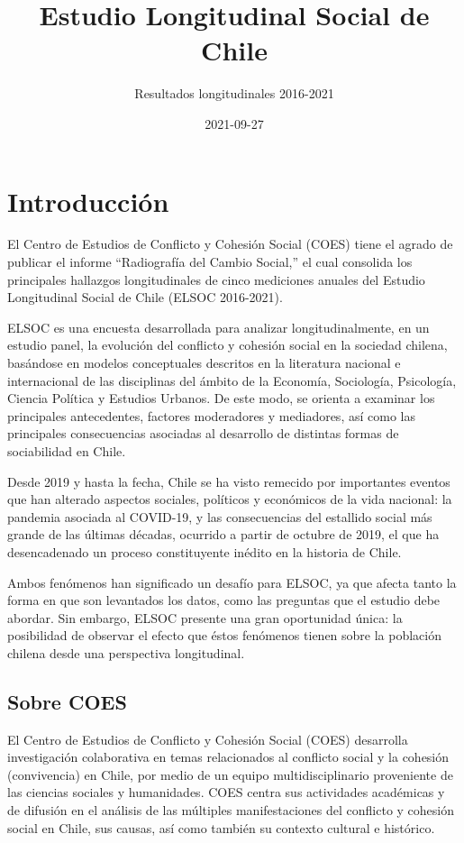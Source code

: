 \documentclass[
  12pt,
  openany]{book}
\title{Estudio Longitudinal Social de Chile}
\subtitle{Resultados longitudinales 2016-2021}
\author{}
\date{\vspace{-2.5em}2021-09-27}
\begin{document}
\maketitle

\listoftables
\listoffigures
{}
\hypertarget{introducciuxf3n}{%
\chapter{Introducción}\label{introducciuxf3n}}

El Centro de Estudios de Conflicto y Cohesión Social (COES) tiene el agrado de publicar el informe ``Radiografía del Cambio Social,'' el cual consolida los principales hallazgos longitudinales de cinco mediciones anuales del Estudio Longitudinal Social de Chile (ELSOC 2016-2021).

ELSOC es una encuesta desarrollada para analizar longitudinalmente, en un estudio panel, la evolución del conflicto y cohesión social en la sociedad chilena, basándose en modelos conceptuales descritos en la literatura nacional e internacional de las disciplinas del ámbito de la Economía, Sociología, Psicología, Ciencia Política y Estudios Urbanos. De este modo, se orienta a examinar los principales antecedentes, factores moderadores y mediadores, así como las principales consecuencias asociadas al desarrollo de distintas formas de sociabilidad en Chile.

Desde 2019 y hasta la fecha, Chile se ha visto remecido por importantes eventos que han alterado aspectos sociales, políticos y económicos de la vida nacional: la pandemia asociada al COVID-19, y las consecuencias del estallido social más grande de las últimas décadas, ocurrido a partir de octubre de 2019, el que ha desencadenado un proceso constituyente inédito en la historia de Chile.

Ambos fenómenos han significado un desafío para ELSOC, ya que afecta tanto la forma en que son levantados los datos, como las preguntas que el estudio debe abordar. Sin embargo, ELSOC presente una gran oportunidad única: la posibilidad de observar el efecto que éstos fenómenos tienen sobre la población chilena desde una perspectiva longitudinal.

\hypertarget{sobre-coes}{%
\section{Sobre COES}\label{sobre-coes}}

El Centro de Estudios de Conflicto y Cohesión Social (COES) desarrolla investigación colaborativa en temas relacionados al conflicto social y la cohesión (convivencia) en Chile, por medio de un equipo multidisciplinario proveniente de las ciencias sociales y humanidades. COES centra sus actividades académicas y de difusión en el análisis de las múltiples manifestaciones del conflicto y cohesión social en Chile, sus causas, así como también su contexto cultural e histórico.
\end{document}
